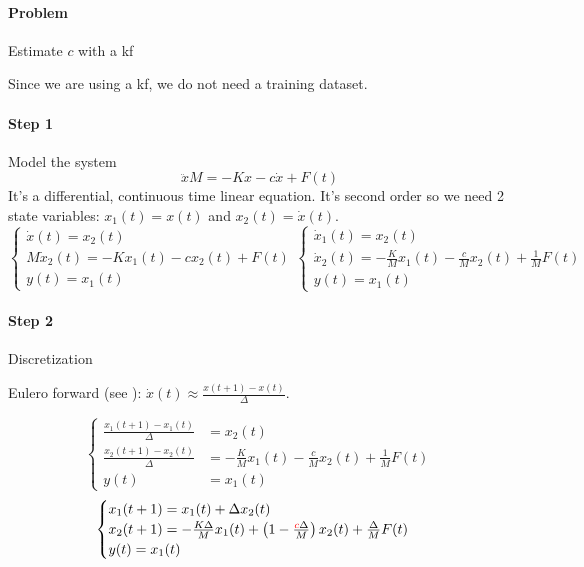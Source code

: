 \begin{example}
    \paragraph{Problem} Estimate $c$ with a \gls{kf}

    Since we are using a \gls{kf}, we do not need a training dataset.

    \paragraph{Step 1} Model the system
    \[
        \ddot{x}M = -Kx - c\dot{x} + F(t)
    \]
    It's a differential, continuous time linear equation.
    It's second order so we need 2 state variables: $x_1(t) = x(t)$ and $x_2(t) = \dot{x}(t)$.
    \[
        \begin{cases}
            \dot{x}(t) = x_2(t) \\
            M\dot{x}_2(t) = -Kx_1(t) -cx_2(t) + F(t) \\
            y(t) = x_1(t)
        \end{cases}
        \begin{cases}
            \dot{x}_1(t) = x_2(t) \\
            \dot{x}_2(t) = -\frac{K}{M} x_1(t) - \frac{c}{M} x_2(t) + \frac{1}{M}F(t) \\
            y(t) = x_1(t)
        \end{cases}
    \]

    \paragraph{Step 2} Discretization

    Eulero forward (see ): $\dot{x}(t) \approx \frac{x(t+1)-x(t)}{\Delta}$.

    \[
        \begin{cases}
            \frac{x_1(t+1)-x_1(t)}{\Delta} &= x_2(t) \\
            \frac{x_2(t+1)-x_2(t)}{\Delta} &= -\frac{K}{M} x_1(t) - \frac{c}{M} x_2(t) + \frac{1}{M}F(t) \\
            y(t) &= x_1(t)
        \end{cases}
    \]
    \[
        \begin{cases}
            x_1(t+1) = x_1(t) + \Delta x_2(t) \\
            x_2(t+1) = -\frac{K\Delta}{M}x_1(t) + \left(1-\frac{{\color{red}c}\Delta}{M}\right)x_2(t) + \frac{\Delta}{M}F(t) \\
            y(t) = x_1(t)
        \end{cases}
    \]


\end{example}
